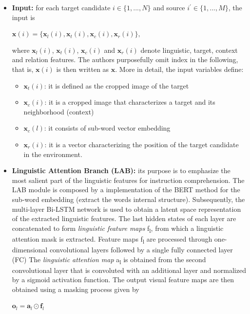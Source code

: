 \begin{itemize}
\item
  \textbf{Input:} for each target candidate $i \in \{1, . . ., N\}$
  and source $i^{'} \in \{1, . . ., M\}$, the input is

  $ {\mathbf x}(i)=\lbrace {\mathbf x}_{l}(i), {\mathbf x}_{t} (i), {\mathbf x}_{c} (i), {\mathbf x}_{r} (i) \rbrace, $

  where ${\mathbf x}_l(i)$, ${\mathbf x}_t(i)$, ${\mathbf x}_c(i)$ and
  ${\mathbf x}_r(i)$ denote linguistic, target, context and relation
  features. The authors purposefully omit index in the following, that
  is, ${\mathbf x}(i)$ is then written as ${\mathbf x}$. More in detail, the
  input variables define:

  \begin{itemize}
  \item
    ${\mathbf x}_t(i)$: it is defined as the cropped image of the target
  \item
    ${\mathbf x}_c(i)$: it is a cropped image that characterizes a target
    and its neighborhood (context)
  \item
    ${\mathbf x}_c(l)$: it consists of sub-word vector embedding
  \item
    ${\mathbf x}_r(i)$: it is a vector characterizing the position of the
    target candidate in the environment.
  \end{itemize}
\item
  \textbf{Linguistic Attention Branch (LAB):} its purpose is to
  emphasize the most salient part of the linguistic features for
  instruction comprehension. The LAB module is composed by a
  implementation of the BERT method for the sub-word embedding (extract
  the words internal structure). Subsequently, the multi-layer Bi-LSTM
  network is used to obtain a latent space representation of the
  extracted linguistic features. The last hidden states of each layer
  are concatenated to form \emph{linguistic feature maps}
  f\textsubscript{l}, from which a linguistic attention mask is
  extracted. Feature maps f\textsubscript{l} are processed through
  one-dimensional convolutional layers followed by a single fully
  connected layer (FC) The \emph{linguistic attention map}
  a\textsubscript{l} is obtained from the second convolutional layer
  that is convoluted with an additional layer and normalized by a
  sigmoid activation function. The output visual feature maps are then
  obtained using a masking process given by

  $ {\mathbf o}_{l}= {\mathbf a}_l \odot {\mathbf f}_{l} $


\end{itemize}
